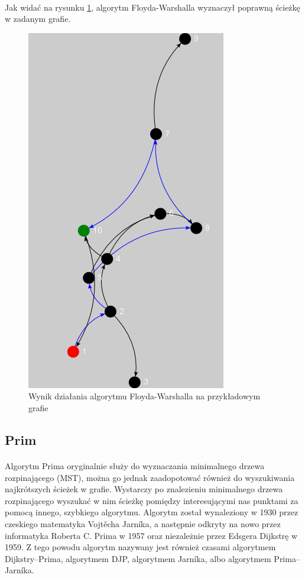 \paragraph{}
Jak widać na rysunku \ref{fig:floyd}, algorytm Floyda-Warshalla wyznaczył poprawną ścieżkę w zadanym grafie.
\begin{figure}[!h]
 \centering
 \includegraphics{algorithms/floyd}
 \caption{Wynik działania algorytmu Floyda-Warshalla na przykładowym grafie}
 \label{fig:floyd}
\end{figure}

\subsection{Prim}
\paragraph{}
Algorytm Prima oryginalnie służy do wyznaczania minimalnego drzewa rozpinającego (MST), można go jednak zaadopotować również do wyszukiwania najkrótszych ścieżek w grafie.
Wystarczy po znalezieniu minimalnego drzewa rozpinającego wyszukać w nim ścieżkę pomiędzy interesującymi nas punktami za pomocą innego, szybkiego algorytmu.
Algorytm został wynaleziony w 1930 przez czeskiego matematyka Vojtěcha Jarníka, a następnie odkryty na nowo przez informatyka Roberta C. Prima w 1957 oraz niezależnie przez Edsgera Dijkstrę w 1959. 
Z tego powodu algorytm nazywany jest również czasami algorytmem Dijkstry–Prima, algorytmem DJP, algorytmem Jarníka, albo algorytmem Prima–Jarníka.

